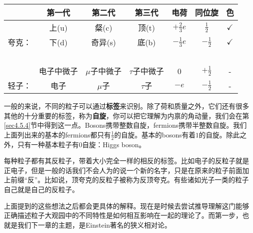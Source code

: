 \begin{table}[h]
\centering
\begin{tabular}{c|c|c|c|c|c|c}
 \hline
 & 第一代 & 第二代 & 第三代 & 电荷 & 同位旋 & 色 \\
 \hline
 & 上(u)  & 粲(c) &  顶(t) & $+\tfrac{2}{3}e$  & $\tfrac{1}{2}$ & $\checkmark$\\
 夸克： & 下(d) & 奇异(s) &底(b) & $-\tfrac{1}{3}e$ & $-\tfrac{1}{2}$ & $\checkmark$\\
 \hline
 \ &\ &\ &\ &\ &\ &\ \\
 \hline
 & 电子中微子 & $\mu$子中微子 & $\tau$子中微子 & 0 & $+\tfrac{1}{2}$ & -\\
 轻子：&电子 & $\mu$子 & $\tau$子 & $-e$ & $-\tfrac{1}{2}$ & -\\
 \hline
\end{tabular}
\end{table}

一般的来说，不同的粒子可以通过{\bfseries 标签}来识别。除了荷和质量之外，它们还有很多其他的十分重要的标签，称为{\bfseries 自旋}，你可以把它理解为内禀的角动量，我们会在第\ref{sec4.5.4}节中得到这一点。Bosons携带整数自旋，fermions携带半整数自旋。我们上面列出来的基本的fermions都只有$\tfrac{1}{2}$的自旋。基本的bosons有着$1$的自旋。除此之外，只有一种基本粒子有$0$自旋：Higgs boson。

每种粒子都有其反粒子，带着大小完全一样的相反的标签。比如电子的反粒子就是正电子，但是一般的话我们不会人为的说一个新的名字，只是在原来的粒子前面加上前缀“反”。比如说，顶夸克的反粒子被称为反顶夸克。有些诸如光子一类的粒子自己就是自己的反粒子。

上面提到的这些想法之后都会更具体的解释。现在是时候去尝试推导理解这门能够正确描述粒子大观园中的不同特性是如何相互影响在一起的理论了。而第一步，也就是我们下一章的主题，是Einstein著名的狭义相对论。




